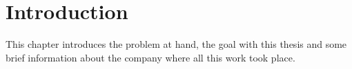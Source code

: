 \chapter{Introduction}

This chapter introduces the problem at hand, the goal with this thesis and some brief information about the company where all this work took place.












